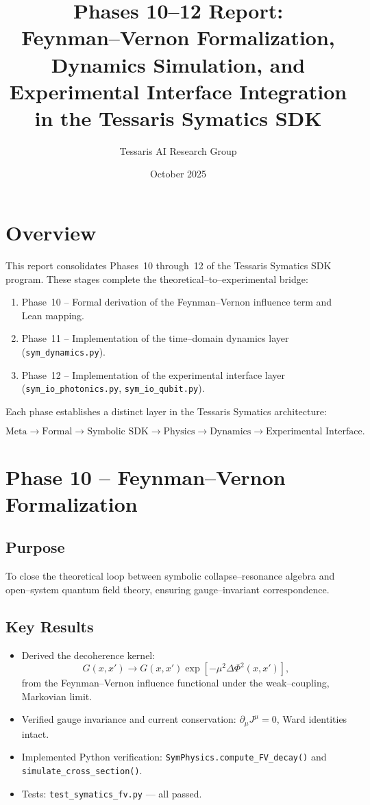 \documentclass[12pt]{article}
\title{Phases 10--12 Report:\\
Feynman--Vernon Formalization, Dynamics Simulation, and Experimental Interface Integration in the Tessaris Symatics SDK}
\author{Tessaris AI Research Group}
\date{October 2025}
\begin{document}
\maketitle

\section*{Overview}
This report consolidates Phases~10 through~12 of the Tessaris Symatics SDK program.
These stages complete the theoretical--to--experimental bridge:
\begin{enumerate}[noitemsep]
  \item Phase~10 -- Formal derivation of the Feynman--Vernon influence term and Lean mapping.
  \item Phase~11 -- Implementation of the time--domain dynamics layer (\texttt{sym_dynamics.py}).
  \item Phase~12 -- Implementation of the experimental interface layer (\texttt{sym\_io\_photonics.py}, \texttt{sym\_io\_qubit.py}).
\end{enumerate}

Each phase establishes a distinct layer in the Tessaris Symatics architecture:

\[
\text{Meta} \rightarrow \text{Formal} \rightarrow
\text{Symbolic SDK} \rightarrow
\text{Physics} \rightarrow
\text{Dynamics} \rightarrow
\text{Experimental Interface.}
\]

\section{Phase 10 -- Feynman--Vernon Formalization}
\subsection*{Purpose}
To close the theoretical loop between symbolic collapse--resonance algebra and open--system quantum field theory, ensuring gauge--invariant correspondence.

\subsection*{Key Results}
\begin{itemize}[noitemsep]
  \item Derived the decoherence kernel:
  \[
  G(x,x') \to G(x,x') \exp[-\mu^2 \Delta\Phi^2(x,x')],
  \]
  from the Feynman--Vernon influence functional under the weak--coupling, Markovian limit.
  \item Verified gauge invariance and current conservation:
  \(\partial_\mu J^\mu = 0\), Ward identities intact.
  \item Implemented Python verification: \texttt{SymPhysics.compute\_FV\_decay()} and \texttt{simulate\_cross\_section()}.
  \item Tests: \texttt{test\_symatics\_fv.py} --- all passed.
\end{itemize}
\end{document}
